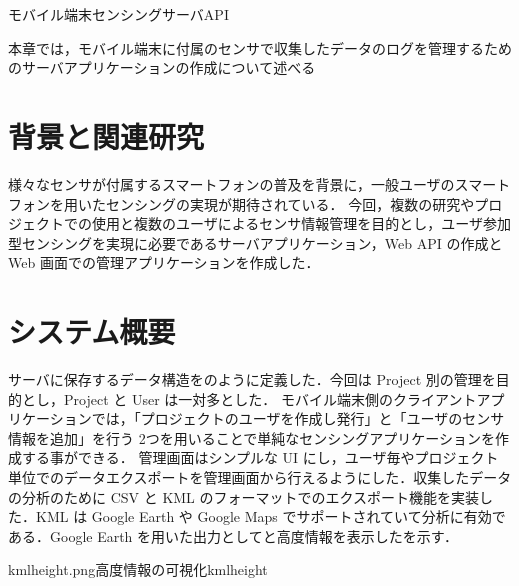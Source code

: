 \chapterhead
{モバイル端末センシングサーバAPI}

{本章では，モバイル端末に付属のセンサで収集したデータのログを管理するためのサーバアプリケーションの作成について述べる}



\section{背景と関連研究}
様々なセンサが付属するスマートフォンの普及を背景に，一般ユーザのスマートフォンを用いたセンシングの実現が期待されている\cite{usersencing}．
今回，複数の研究やプロジェクトでの使用と複数のユーザによるセンサ情報管理を目的とし，ユーザ参加型センシングを実現に必要であるサーバアプリケーション，Web API の作成と Web 画面での管理アプリケーションを作成した．

\section{システム概要}
サーバに保存するデータ構造をのように定義した．今回は Project 別の管理を目的とし，Project と User は一対多とした．
モバイル端末側のクライアントアプリケーションでは，「プロジェクトのユーザを作成し発行」と「ユーザのセンサ情報を追加」を行う 2つを用いることで単純なセンシングアプリケーションを作成する事ができる．
管理画面はシンプルな UI にし，ユーザ毎やプロジェクト単位でのデータエクスポートを管理画面から行えるようにした．収集したデータの分析のために CSV と KML のフォーマットでのエクスポート機能を実装した．KML は Google Earth や Google Maps でサポートされていて分析に有効である．Google Earth を用いた出力としてと高度情報を表示したを示す．


\vspace{-1cm}

{kmlheight.png}{高度情報の可視化}{kmlheight}



\newpage
